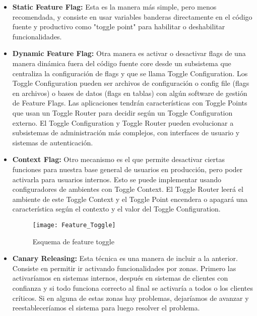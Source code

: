 \begin{itemize}

\item \textbf{Static Feature Flag:} Esta es la manera más simple, pero menos recomendada, y consiste en usar variables banderas directamente en el código fuente y productivo como "toggle point" para habilitar o deshabilitar funcionalidades.

\item \textbf{Dynamic Feature Flag:} Otra manera es activar o desactivar flags de una manera dinámica fuera del código fuente core desde un subsistema que centraliza la configuración de flags y que se llama Toggle Configuration. Los  Toggle Configuration pueden ser archivos de configuración o config file (flags en archivos) o bases de datos (flags en tablas) con algún software de gestión de Feature Flags. Las aplicaciones tendrán características con Toggle Points que usan un Toggle Router para decidir según un Toggle Configuration externo. El Toggle Configuration y Toggle Router pueden evolucionar a subsistemas de administración más complejos, con interfaces de usuario y sistemas de autenticación.

\item \textbf{Context Flag:} Otro mecanismo es el que permite desactivar ciertas funciones para nuestra base general de usuarios en producción, pero poder activarla para usuarios internos. Esto se puede implementar usando configuradores de ambientes con Toggle Context. El Toggle Router leerá el ambiente de este Toggle Context y el Toggle Point encendera o apagará una característica según el contexto y el valor del Toggle Configuration.

\begin{figure}[h]
  \centering
  \texttt{[image: Feature\_Toggle]}
  \caption{Esquema de feature toggle}
  \centering
  \label{fig:Feature_Toggle} %
\end{figure}
\FloatBarrier %

\item \textbf{Canary Releasing:} Esta técnica es una manera de incluir a la anterior. Consiste en permitir ir activando funcionalidades por zonas. Primero las activaríamos en sistemas internos, después en sistemas de clientes con confianza y si todo funciona correcto al final se activaría a todos o los clientes críticos. Si en alguna de estas zonas hay problemas, dejaríamos de avanzar y reestableceríamos el sistema para luego resolver el problema.


\end{itemize}
